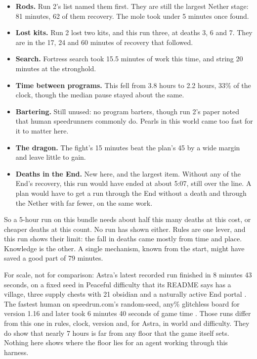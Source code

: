 \documentclass[11pt,a4paper]{article}
\begin{document}
\begin{itemize}
  \item \textbf{Rods.} Run 2's list named them first. They are still the largest Nether stage: 81 minutes, 62 of them recovery. The mole took under 5 minutes once found.
  \item \textbf{Lost kits.} Run 2 lost two kits, and this run three, at deaths 3, 6 and 7. They are in the 17, 24 and 60 minutes of recovery that followed.
  \item \textbf{Search.} Fortress search took 15.5 minutes of work this time, and string 20 minutes at the stronghold.
  \item \textbf{Time between programs.} This fell from 3.8 hours to 2.2 hours, 33\% of the clock, though the median pause stayed about the same.
  \item \textbf{Bartering.} Still unused: no program barters, though run 2's paper noted that human speedrunners commonly do. Pearls in this world came too fast for it to matter here.
  \item \textbf{The dragon.} The fight's 15 minutes beat the plan's 45 by a wide margin and leave little to gain.
  \item \textbf{Deaths in the End.} New here, and the largest item. Without any of the End's recovery, this run would have ended at about 5:07, still over the line. A plan would have to get a run through the End without a death and through the Nether with far fewer, on the same work.
\end{itemize}

\noindent So a 5-hour run on this bundle needs about half this many deaths at this cost, or cheaper deaths at this count. No run has shown either. Rules are one lever, and this run shows their limit: the fall in deaths came mostly from time and place. Knowledge is the other. A single mechanism, known from the start, might have saved a good part of 79 minutes.

For scale, not for comparison: Astra's latest recorded run finished in 8 minutes 43 seconds, on a fixed seed in Peaceful difficulty that its README says has a village, three supply chests with 21 obsidian and a naturally active End portal \citep{malde2026astra}. The fastest human on speedrun.com's random-seed, any\% glitchless board for version 1.16 and later took 6 minutes 40 seconds of game time \citep{speedrun2026}. Those runs differ from this one in rules, clock, version and, for Astra, in world and difficulty. They do show that nearly 7 hours is far from any floor that the game itself sets. Nothing here shows where the floor lies for an agent working through this harness.
\end{document}

